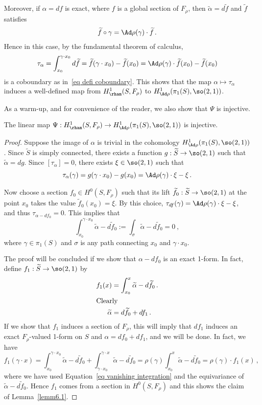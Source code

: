 Moreover, if $\alpha=df$ is exact, where $f$ is a global section of $F_\rho$, then $\widetilde\alpha=d\widetilde f$ and $\widetilde f$ satisfies
\[
\widetilde f\circ \gamma=\Ad\rho(\gamma)\cdot \widetilde f\,.
\]
Hence in this case, by the fundamental theorem of calculus,
\[
\tau_\alpha=\int_{x_0}^{\gamma\cdot x_0}d\widetilde f=\widetilde f(\gamma\cdot x_0)-\widetilde f(x_0)=\Ad\rho(\gamma)\cdot \widetilde f(x_0)-\widetilde f(x_0)
\]
is a coboundary as in~\eqref{eq defi coboundary}. This shows that the map $\alpha\mapsto\tau_\alpha$ induces a well-defined map from $H^1_{\rham}(S,F_\rho)$ to $H^1_{\Ad\rho}(\pi_1(S),\so(2,1))$.

As a warm-up, and for convenience of the reader, we also show that $\Psi$ is injective.

\begin{lemm}\label{lemm6.1}
The linear map $\Psi:H^1_{\rham}(S,F_\rho)\to H^1_{\Ad\rho}(\pi_1(S),\so(2,1))$ is injective.
\end{lemm}


\begin{proof}
Suppose the image of $\alpha$ is trivial in the cohomology $H^1_{\Ad\rho}(\pi_1(S),\so(2,1))$. Since $\widetilde S$ is simply connected, there exists a function $g:\widetilde S\to\so(2,1)$ such that $\widetilde \alpha=dg$. Since $[\tau_\alpha]=0$, there exists $\xi\in\so(2,1)$ such that
\[
\tau_\alpha(\gamma)=g(\gamma\cdot x_0)-g(x_0)=\Ad\rho(\gamma)\cdot \xi-\xi\,.
\]

Now choose a section $f_0\in H^0(S,F_\rho)$ such that its lift $\widetilde f_0:\widetilde S\to\so(2,1)$ at the point $x_0$ takes the value $\widetilde f_0(x_0)=\xi$. By this choice, $\tau_{df}(\gamma)=\Ad\rho(\gamma)\cdot \xi-\xi$, and thus $\tau_{\alpha-df_0}=0$. This implies that
\begin{equation}\label{eq vanishing integration}
\int_{x_0}^{\gamma\cdot x_0}\widetilde\alpha-d\widetilde f_0:=\int_\sigma \widetilde\alpha-d\widetilde f_0=0~,
\end{equation}
where $\gamma\in\pi_1(S)$ and $\sigma$ is any path connecting $x_0$ and $\gamma\cdot x_0$.

The proof will be concluded if we show that $\alpha-df_0$ is an exact 1-form. In fact, define $f_1:\widetilde S\to\so(2,1)$ by
\begin{align*}
f_1(x)&=\int_{x_0}^{x} \widetilde\alpha-d\widetilde f_0\,.\\
\intertext{Clearly}
\widetilde \alpha &=d\widetilde f_0+d f_1\,.
\end{align*}
If we show that $f_1$ induces a section of $F_\rho$, this will imply that $df_1$ induces an exact $F_\rho$-valued 1-form on $S$ and $\alpha=df_0+df_1$, and we will be done. In fact, we have
\[
f_1(\gamma\cdot x)=\int^{\gamma\cdot x_0}_{x_0}\widetilde\alpha-d\widetilde f_0+\int^{\gamma\cdot x}_{\gamma\cdot x_0}\widetilde\alpha-d\widetilde f_0=\rho(\gamma) \int^{x}_{x_0}\widetilde\alpha-d\widetilde f_0=\rho(\gamma)\cdot f_1(x)\,,
\]
where we have used Equation~\eqref{eq vanishing integration} and the equivariance of $\widetilde \alpha-d\widetilde f_0$. Hence $f_1$ comes from a section in $H^0(S,F_\rho)$ and this shows the claim of Lemma~\ref{lemm6.1}.
\end{proof}



